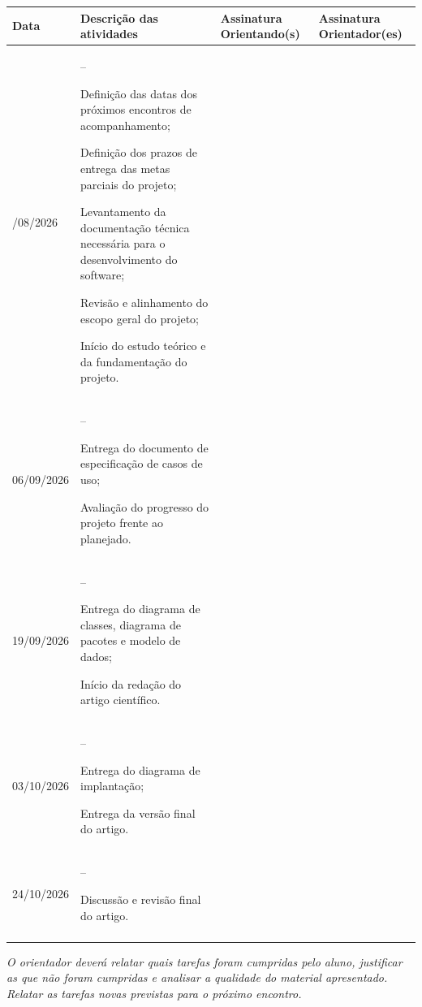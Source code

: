 \documentclass[12pt,a4paper]{article}
\newenvironment{listacompacta}{%
  \begin{list}{--}{\setlength{\leftmargin}{10pt}\setlength{\itemsep}{0pt}%
  \setlength{\parsep}{0pt}\setlength{\topsep}{0pt}\setlength{\partopsep}{0pt}}
}{\end{list}}
\begin{document}
\renewcommand{\arraystretch}{1.3}
\begin{longtable}{|>{\centering\arraybackslash}m{2.0cm}|m{7.0cm}|>{\centering\arraybackslash}m{2.4cm}|>{\centering\arraybackslash}m{2.4cm}|}
\hline
\textbf{Data} & {\centering\textbf{Descrição das atividades}\par} & \textbf{Assinatura Orientando(s)} & \textbf{Assinatura Orientador(es)} \\
\hline
\endhead

19/08/2026 &
\begin{listacompacta}
  \item Definição das datas dos próximos encontros de acompanhamento;
  \item Definição dos prazos de entrega das metas parciais do projeto;
  \item Levantamento da documentação técnica necessária para o desenvolvimento do software;
  \item Revisão e alinhamento do escopo geral do projeto;
  \item Início do estudo teórico e da fundamentação do projeto.
\end{listacompacta} & & \\
\hline

06/09/2026 &
\begin{listacompacta}
  \item Entrega do documento de especificação de casos de uso;
  \item Avaliação do progresso do projeto frente ao planejado.
\end{listacompacta} & & \\
\hline

19/09/2026 &
\begin{listacompacta}
  \item Entrega do diagrama de classes, diagrama de pacotes e modelo de dados;
  \item Início da redação do artigo científico.
\end{listacompacta} & & \\
\hline

03/10/2026 &
\begin{listacompacta}
  \item Entrega do diagrama de implantação;
  \item Entrega da versão final do artigo.
\end{listacompacta} & & \\
\hline

24/10/2026 &
\begin{listacompacta}
  \item Discussão e revisão final do artigo.
\end{listacompacta} & & \\
\hline

 & & & \\[1.5cm]
\hline
\end{longtable}

\vspace{6pt}
{\small\itshape *O orientador deverá relatar quais tarefas foram cumpridas pelo aluno, justificar as
que não foram cumpridas e analisar a qualidade do material apresentado. Relatar as tarefas novas
previstas para o próximo encontro.\par}
\end{document}
